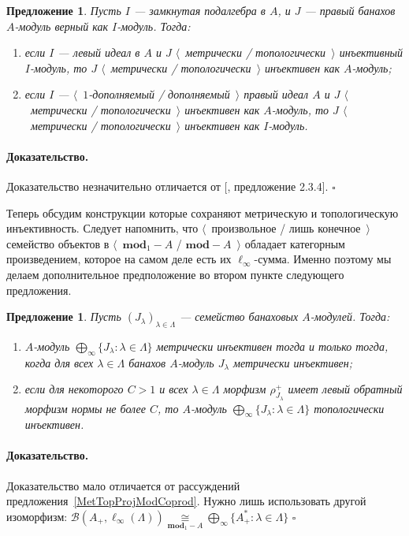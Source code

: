 \documentclass[12pt]{article}
\newcommand{\isom}[1]{\mathop{\mathbin{\cong}}\limits_{#1}}
\newtheorem{proposition}[theorem]{Предложение}
\renewenvironment{proof}{\paragraph{Доказательство.}}{\hfill$\square$\medskip}
\begin{document}
\begin{proposition}\label{MetTopInjUnderChangeOfAlg} Пусть $I$ --- замкнутая
    подалгебра в $A$, и $J$ --- правый банахов $A$-модуль верный как $I$-модуль.
    Тогда:
    \begin{enumerate}[label = (\roman*)]
        \item если $I$ --- левый идеал в $A$ и $J$ $\langle$~метрически /
              топологически~$\rangle$ инъективный $I$-модуль, то 
              $J$ $\langle$~метрически / топологически~$\rangle$ 
              инъективен как $A$-модуль;

        \item если $I$ --- $\langle$~$1$-дополняемый / дополняемый~$\rangle$ 
              правый идеал $A$ и $J$ 
              $\langle$~метрически / топологически~$\rangle$ инъективен
              как $A$-модуль, то $J$ 
              $\langle$~метрически / топологически~$\rangle$
              инъективен как $I$-модуль.
    \end{enumerate}

\end{proposition}
\begin{proof} Доказательство незначительно отличается от
    [\cite{RamsHomPropSemgroupAlg}, предложение 2.3.4].
\end{proof}

Теперь обсудим конструкции которые сохраняют метрическую и топологическую
инъективность. Следует напомнить, что $\langle$~произвольное / лишь
конечное~$\rangle$ семейство объектов в $\langle$~$\mathbf{mod}_1-A$ /
$\mathbf{mod}-A$~$\rangle$ обладает категорным произведением, которое на самом
деле есть их $\ell_\infty$-сумма. Именно поэтому мы делаем дополнительное
предположение во втором пункте следующего предложения.

\begin{proposition}\label{MetTopInjModProd} Пусть
    ${(J_\lambda)}_{\lambda\in\Lambda}$ --- семейство банаховых $A$-модулей.
    Тогда:
    \begin{enumerate}[label = (\roman*)]
        \item $A$-модуль $\bigoplus_\infty \{J_\lambda:\lambda\in\Lambda \}$
              метрически инъективен тогда и только тогда, когда для всех
              $\lambda\in\Lambda$ банахов $A$-модуль 
              $J_\lambda$ метрически инъективен;

        \item если для некоторого $C>1$ и всех $\lambda\in\Lambda$  морфизм
              $\rho_{J_\lambda}^+$ имеет левый обратный морфизм нормы не 
              более $C$, то $A$-модуль 
              $\bigoplus_\infty \{J_\lambda:\lambda\in\Lambda \}$ 
              топологически инъективен.
    \end{enumerate}


\end{proposition}
\begin{proof} Доказательство мало отличается от рассуждений
    предложения~\ref{MetTopProjModCoprod}. Нужно лишь использовать другой
    изоморфизм:
    $\mathcal{B}(A_+,\ell_\infty(\Lambda))
        \isom{\mathbf{mod}_1-A}
        \bigoplus_\infty \{A_+^*:\lambda\in\Lambda \}$
\end{proof}
\end{document}
